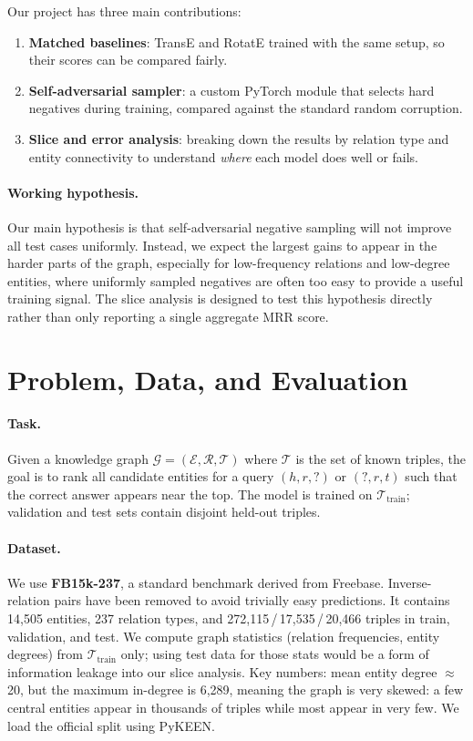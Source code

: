 \documentclass{llncs}
\begin{document}
Our project has three main contributions:
\begin{enumerate}
  \item \textbf{Matched baselines}: TransE and RotatE trained with the
        same setup, so their scores can be compared fairly.
  \item \textbf{Self-adversarial sampler}: a custom PyTorch module that
        selects hard negatives during training, compared against the
        standard random corruption.
  \item \textbf{Slice and error analysis}: breaking down the results by
        relation type and entity connectivity to understand \emph{where}
        each model does well or fails.
\end{enumerate}

\paragraph{Working hypothesis.}
Our main hypothesis is that self-adversarial negative sampling will not
improve all test cases uniformly.
Instead, we expect the largest gains to appear in the harder parts of the
graph, especially for low-frequency relations and low-degree entities,
where uniformly sampled negatives are often too easy to provide a useful
training signal.
The slice analysis is designed to test this hypothesis directly rather
than only reporting a single aggregate MRR score.

\section{Problem, Data, and Evaluation}

\paragraph{Task.}
Given a knowledge graph $\mathcal{G}=(\mathcal{E},\mathcal{R},\mathcal{T})$
where $\mathcal{T}$ is the set of known triples, the goal is to rank all
candidate entities for a query $(h,r,?)$ or $(?,r,t)$ such that the
correct answer appears near the top.
The model is trained on $\mathcal{T}_{\text{train}}$; validation and test
sets contain disjoint held-out triples.

\paragraph{Dataset.}
We use \textbf{FB15k-237}, a standard benchmark derived from Freebase.
Inverse-relation pairs have been removed to avoid trivially easy predictions.
It contains 14,505 entities, 237 relation types, and
272,115\,/\,17,535\,/\,20,466 triples in train, validation, and test.
We compute graph statistics (relation frequencies, entity degrees) from
$\mathcal{T}_{\text{train}}$ only; using test data for those stats would
be a form of information leakage into our slice analysis.
Key numbers: mean entity degree $\approx$\,20, but the maximum in-degree
is 6,289, meaning the graph is very skewed: a few central entities appear
in thousands of triples while most appear in very few.
We load the official split using PyKEEN.
\end{document}
